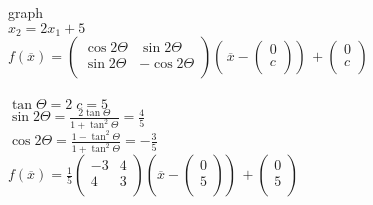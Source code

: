 \documentclass [a4paper,12pt]{article}
\begin{document}
\section{}
graph\\
$x_2 = 2x_1 + 5$\\
$f({\overline{x}})= \left(
\begin{matrix}
\cos{2\Theta} & \sin{2\Theta}\\
\sin{2\Theta} & -\cos{2\Theta}\\
\end{matrix}
\right
)
( \, {\overline{x}} -
\left(
\begin{matrix}
0\\
c\\
\end{matrix}
\right
)
) \, +
\left(
\begin{matrix}
0\\
c\\
\end{matrix}
\right
)
$\\
\\
$\tan{\Theta} = 2\;  c = 5$\\
$\sin{2\Theta} = \frac{2\tan{\Theta}}{1+\tan^2{\Theta}}=\frac{4}{5}$\\
$\cos{2\Theta} = \frac{1-\tan^2{\Theta}}{1 + \tan^2{\Theta}} = - \frac{3}{5}$\\
$f({\overline{x}})= \frac{1}{5}\left(
\begin{matrix}
-3 & 4\\
4 & 3\\
\end{matrix}
\right
)
\left ( {\overline{x}} -
\left(
\begin{matrix}
0\\
5\\
\end{matrix}
\right
)
\right ) \, +
\left(
\begin{matrix}
0\\
5\\
\end{matrix}
\right
)
$\\
\end{document}
